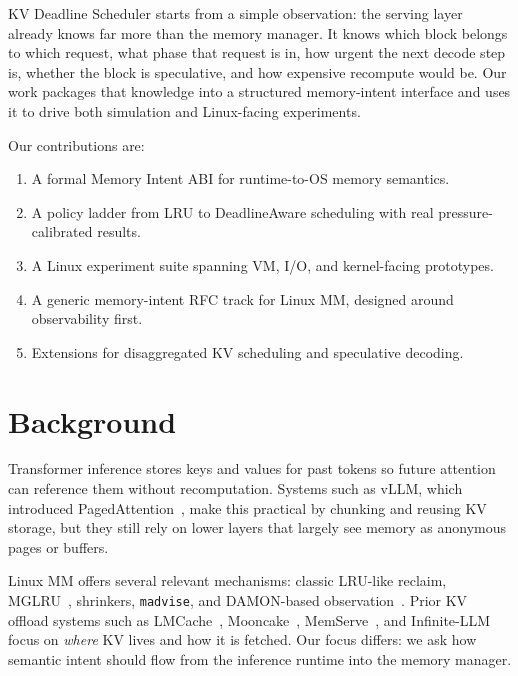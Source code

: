 \documentclass[10pt,twocolumn]{article}
\begin{document}
KV Deadline Scheduler starts from a simple observation: the serving layer already knows far more than the memory manager. It knows which block belongs to which request, what phase that request is in, how urgent the next decode step is, whether the block is speculative, and how expensive recompute would be. Our work packages that knowledge into a structured memory-intent interface and uses it to drive both simulation and Linux-facing experiments.

Our contributions are:

\begin{enumerate}
  \item A formal Memory Intent ABI for runtime-to-OS memory semantics.
  \item A policy ladder from LRU to DeadlineAware scheduling with real pressure-calibrated results.
  \item A Linux experiment suite spanning VM, I/O, and kernel-facing prototypes.
  \item A generic memory-intent RFC track for Linux MM, designed around observability first.
  \item Extensions for disaggregated KV scheduling and speculative decoding.
\end{enumerate}

\section{Background}
\label{sec:bg}

Transformer inference stores keys and values for past tokens so future attention can reference them without recomputation. Systems such as vLLM, which introduced PagedAttention~\cite{pagedattention,vllm}, make this practical by chunking and reusing KV storage, but they still rely on lower layers that largely see memory as anonymous pages or buffers.

Linux MM offers several relevant mechanisms: classic LRU-like reclaim, MGLRU~\cite{mglru}, shrinkers, \texttt{madvise}, and DAMON-based observation~\cite{damon}. Prior KV offload systems such as LMCache~\cite{lmcache}, Mooncake~\cite{mooncake}, MemServe~\cite{memserve}, and Infinite-LLM~\cite{infinitellm} focus on \emph{where} KV lives and how it is fetched. Our focus differs: we ask how semantic intent should flow from the inference runtime into the memory manager.

\end{document}
